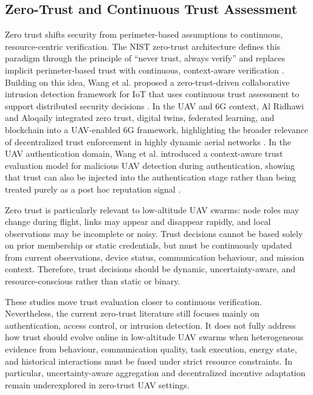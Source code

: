 \documentclass[notspecified,article,submit,moreauthors]{Definitions/mdpi}
\begin{document}
\subsection{Zero-Trust and Continuous Trust Assessment}
Zero trust shifts security from perimeter-based assumptions to continuous, resource-centric verification. The NIST zero-trust architecture defines this paradigm through the principle of ``never trust, always verify'' and replaces implicit perimeter-based trust with continuous, context-aware verification \cite{rose2020zero}. Building on this idea, Wang et al. proposed a zero-trust-driven collaborative intrusion detection framework for IoT that uses continuous trust assessment to support distributed security decisions \cite{wang2025continuous}. In the UAV and 6G context, Al Ridhawi and Aloqaily integrated zero trust, digital twins, federated learning, and blockchain into a UAV-enabled 6G framework, highlighting the broader relevance of decentralized trust enforcement in highly dynamic aerial networks \cite{ridhawi2023zerotrust6g}. In the UAV authentication domain, Wang et al. introduced a context-aware trust evaluation model for malicious UAV detection during authentication, showing that trust can also be injected into the authentication stage rather than being treated purely as a post hoc reputation signal \cite{wang2026wolf}.

Zero trust is particularly relevant to low-altitude UAV swarms: node roles may change during flight, links may appear and disappear rapidly, and local observations may be incomplete or noisy. Trust decisions cannot be based solely on prior membership or static credentials, but must be continuously updated from current observations, device status, communication behaviour, and mission context. Therefore, trust decisions should be dynamic, uncertainty-aware, and resource-conscious rather than static or binary.

These studies move trust evaluation closer to continuous verification. Nevertheless, the current zero-trust literature still focuses mainly on authentication, access control, or intrusion detection. It does not fully address how trust should evolve online in low-altitude UAV swarms when heterogeneous evidence from behaviour, communication quality, task execution, energy state, and historical interactions must be fused under strict resource constraints. In particular, uncertainty-aware aggregation and decentralized incentive adaptation remain underexplored in zero-trust UAV settings.
\end{document}
